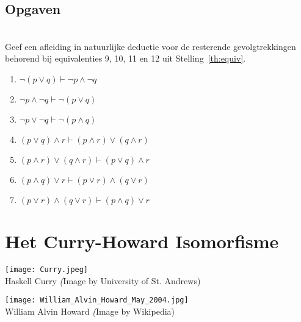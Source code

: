 \subsection{Opgaven}\label{ex:ndc}
\begin{exercise}\mbox{}\\
Geef een afleiding in natuurlijke deductie voor de resterende gevolgtrekkingen behorend bij equivalenties 9, 10, 11 en 12 uit Stelling~\ref{th:equiv}.

\begin{enumerate}[label=\textit{\alph*.}]
\item $\neg(p\lor q) \vdash \neg p\land\neg q$ \\
\item $\neg p\land\neg q \vdash \neg(p\lor q)$ \\
\item $\neg p \lor\neg q \vdash \neg(p\land q)$ \\
\item $(p\lor q)\land r \vdash (p\land r)\lor(q\land r)$ \\
\item $(p\land r)\lor(q\land r) \vdash (p\lor q)\land r$  \\
\item $(p\land q)\lor r \vdash (p\lor r)\land(q\lor r)$ \\
\item $(p\lor r)\land(q\lor r) \vdash (p\land q)\lor r$  \\
\end{enumerate}
\end{exercise}

\newpage
\section{Het Curry-Howard Isomorfisme}\label{sec:curry-howard}

  \begin{marginfigure}

\texttt{[image: Curry.jpeg]}\\
    Haskell Curry {\scriptsize\emph (Image by University of St. Andrews)}\\[3mm]
  \end{marginfigure}
  \begin{marginfigure}
\texttt{[image: William\_Alvin\_Howard\_May\_2004.jpg]}\\
    William Alvin Howard {\scriptsize\emph (Image by Wikipedia)}\\[3mm]
  \end{marginfigure}


